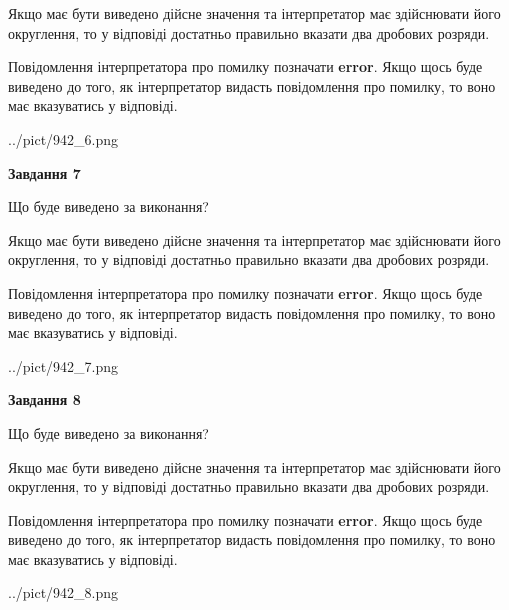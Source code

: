 \documentclass[12pt, ukrainian]{article}
\begin{document}
{\begin {Large}
Якщо має бути виведено дійсне значення та інтерпретатор має здійснювати його округлення, 
то у відповіді достатньо правильно вказати два дробових розряди.

Повідомлення інтерпретатора про помилку позначати \textbf{error}.
Якщо щось буде виведено до того, як інтерпретатор видасть повідомлення про помилку, 
то воно має вказуватись у відповіді. \par

\begin{center}
	{../pict/942_6.png}
\end{center}
\newpage

{\begin {center}\textbf{Завдання 7}\end {center}}\par
Що буде виведено за виконання? \par

Якщо має бути виведено дійсне значення та інтерпретатор має здійснювати його округлення, 
то у відповіді достатньо правильно вказати два дробових розряди.

Повідомлення інтерпретатора про помилку позначати \textbf{error}.
Якщо щось буде виведено до того, як інтерпретатор видасть повідомлення про помилку, 
то воно має вказуватись у відповіді. \par

\begin{center}
	{../pict/942_7.png}
\end{center}
\newpage

{\begin {center}\textbf{Завдання 8}\end {center}}\par
Що буде виведено за виконання? \par

Якщо має бути виведено дійсне значення та інтерпретатор має здійснювати його округлення, 
то у відповіді достатньо правильно вказати два дробових розряди.

Повідомлення інтерпретатора про помилку позначати \textbf{error}.
Якщо щось буде виведено до того, як інтерпретатор видасть повідомлення про помилку, 
то воно має вказуватись у відповіді. \par

\begin{center}
	{../pict/942_8.png}
\end{center}
\newpage


\end{Large}}
\end{document}
